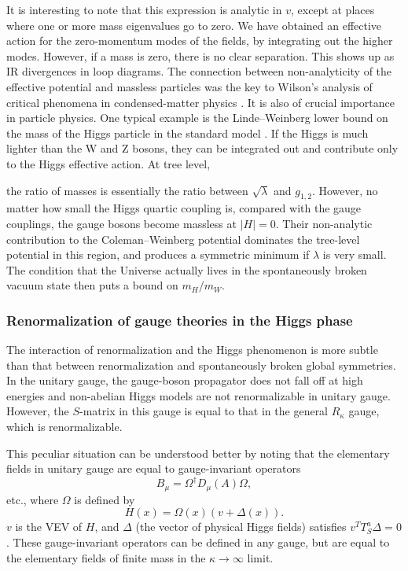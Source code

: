 It is interesting to note that this expression is analytic in $v$, except at
places where one or more mass eigenvalues go to zero. We have obtained an
effective action for the zero-momentum modes of the fields, by integrating out
the higher modes. However, if a mass is zero, there is no clear separation.
This shows up as IR divergences in loop diagrams. The connection between
non-analyticity of the effective potential and massless particles was the key
to Wilson's analysis of critical phenomena in condensed-matter physics
\cite{banks-ref-126}. It is also of crucial importance in particle physics. One
typical example is the Linde--Weinberg lower bound on the mass of the Higgs
particle in the standard model \cite{banks-ref-127,banks-ref-128}. If the Higgs
is much lighter than the W and Z bosons, they can be integrated out and
contribute only to the Higgs effective action. At tree level,

the ratio of masses is essentially the ratio between $\sqrt\lambda$ and
$g_{1,2}$. However, no matter how small the Higgs quartic coupling is, compared
with the gauge couplings, the gauge bosons become massless at $|H|=0$. Their
non-analytic contribution to the Coleman--Weinberg potential dominates the
tree-level potential in this region, and produces a symmetric minimum if
$\lambda$ is very small. The condition that the Universe actually lives in the
spontaneously broken vacuum state then puts a bound on $m_H/m_W$.

\subsubsection{Renormalization of gauge theories in the Higgs phase}

The interaction of renormalization and the Higgs phenomenon is more subtle than
that between renormalization and spontaneously broken global symmetries. In the
unitary gauge, the gauge-boson propagator does not fall off at high energies and
non-abelian Higgs models are not renormalizable in unitary gauge. However, the
$S$-matrix in this gauge is equal to that in the general $R_\kappa$ gauge, which
is renormalizable.

This peculiar situation can be understood better by noting that the elementary
fields in unitary gauge are equal to gauge-invariant operators
\[
  B_\mu=\Omega^\dagger D_\mu(A)\Omega,
\]
etc., where $\Omega$ is defined by
\[
  H(x)=\Omega(x)(v+\Delta(x)).
\]
$v$ is the VEV of $H$, and $\Delta$ (the vector of physical Higgs fields)
satisfies $v^TT_S^a\Delta=0$. These gauge-invariant operators can be defined
in any gauge, but are equal to the elementary fields of finite mass in the
$\kappa\to\infty$ limit.

